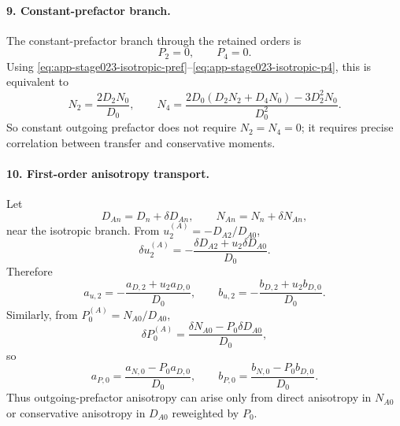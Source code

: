 \paragraph{9. Constant-prefactor branch.}
The constant-prefactor branch through the retained orders is
\begin{equation}
P_2=0,
\qquad
P_4=0.
\end{equation}
Using \eqref{eq:app-stage023-isotropic-pref}--\eqref{eq:app-stage023-isotropic-p4}, this is equivalent to
\begin{equation}
\label{eq:app-stage023-constant-prefactor-conditions}
\boxed{
N_2=\frac{2D_2N_0}{D_0},
\qquad
N_4=\frac{2D_0(D_2N_2+D_4N_0)-3D_2^2N_0}{D_0^2}}.
\end{equation}
So constant outgoing prefactor does not require \(N_2=N_4=0\); it requires precise correlation between transfer and conservative moments.

\paragraph{10. First-order anisotropy transport.}
Let
\begin{equation}
D_{An}=D_n+\delta D_{An},
\qquad
N_{An}=N_n+\delta N_{An},
\end{equation}
near the isotropic branch.  From \(u_2^{(A)}=-D_{A2}/D_{A0}\),
\begin{equation}
\label{eq:app-stage023-du2}
\delta u_2^{(A)}=-\frac{\delta D_{A2}+u_2\delta D_{A0}}{D_0}.
\end{equation}
Therefore
\begin{equation}
\label{eq:app-stage023-u-anisotropy}
\boxed{
a_{u,2}=-\frac{a_{D,2}+u_2a_{D,0}}{D_0},
\qquad
b_{u,2}=-\frac{b_{D,2}+u_2b_{D,0}}{D_0}}.
\end{equation}
Similarly, from \(P_0^{(A)}=N_{A0}/D_{A0}\),
\begin{equation}
\label{eq:app-stage023-dp0}
\delta P_0^{(A)}=\frac{\delta N_{A0}-P_0\delta D_{A0}}{D_0},
\end{equation}
so
\begin{equation}
\label{eq:app-stage023-p-anisotropy}
\boxed{
a_{P,0}=\frac{a_{N,0}-P_0a_{D,0}}{D_0},
\qquad
b_{P,0}=\frac{b_{N,0}-P_0b_{D,0}}{D_0}}.
\end{equation}
Thus outgoing-prefactor anisotropy can arise only from direct anisotropy in \(N_{A0}\) or conservative anisotropy in \(D_{A0}\) reweighted by \(P_0\).


